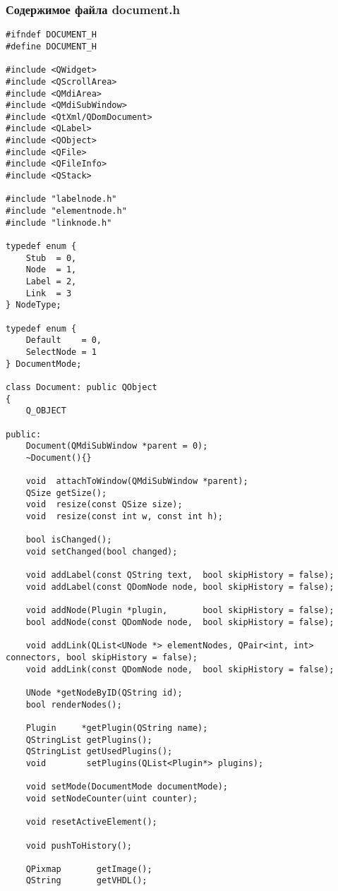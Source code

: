 \subsubsection*{Содержимое файла document.h}

\begin{lstlisting}
#ifndef DOCUMENT_H
#define DOCUMENT_H

#include <QWidget>
#include <QScrollArea>
#include <QMdiArea>
#include <QMdiSubWindow>
#include <QtXml/QDomDocument>
#include <QLabel>
#include <QObject>
#include <QFile>
#include <QFileInfo>
#include <QStack>

#include "labelnode.h"
#include "elementnode.h"
#include "linknode.h"

typedef enum {
    Stub  = 0,
    Node  = 1,
    Label = 2,
    Link  = 3
} NodeType;

typedef enum {
    Default    = 0,
    SelectNode = 1
} DocumentMode;

class Document: public QObject
{
    Q_OBJECT

public:
    Document(QMdiSubWindow *parent = 0);
    ~Document(){}

    void  attachToWindow(QMdiSubWindow *parent);
    QSize getSize();
    void  resize(const QSize size);
    void  resize(const int w, const int h);

    bool isChanged();
    void setChanged(bool changed);

    void addLabel(const QString text,  bool skipHistory = false);
    void addLabel(const QDomNode node, bool skipHistory = false);

    void addNode(Plugin *plugin,       bool skipHistory = false);
    bool addNode(const QDomNode node,  bool skipHistory = false);

    void addLink(QList<UNode *> elementNodes, QPair<int, int> connectors, bool skipHistory = false);
    void addLink(const QDomNode node,  bool skipHistory = false);

    UNode *getNodeByID(QString id);
    bool renderNodes();

    Plugin     *getPlugin(QString name);
    QStringList getPlugins();
    QStringList getUsedPlugins();
    void        setPlugins(QList<Plugin*> plugins);

    void setMode(DocumentMode documentMode);
    void setNodeCounter(uint counter);

    void resetActiveElement();

    void pushToHistory();

    QPixmap       getImage();
    QString       getVHDL();


\end{lstlisting}
